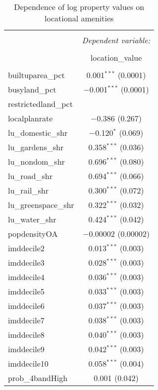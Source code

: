 \documentclass{article}\usepackage[]{graphicx}\usepackage[]{color}
\begin{document}
\begin{table}[!htbp] \centering 
  \caption{Dependence of log property values on locational amenities } 
  \label{} 
\small 
\begin{tabular}{@{\extracolsep{5pt}}lc} 
\\[-1.8ex]\hline 
\hline \\[-1.8ex] 
 & \multicolumn{1}{c}{\textit{Dependent variable:}} \\ 
\cline{2-2} 
\\[-1.8ex] & location\_value \\ 
\hline \\[-1.8ex] 
 builtuparea\_pct & 0.001$^{***}$ (0.0001) \\ 
  busyland\_pct & $-$0.001$^{***}$ (0.0001) \\ 
  restrictedland\_pct &  \\ 
  localplanrate & $-$0.386 (0.267) \\ 
  lu\_domestic\_shr & $-$0.120$^{*}$ (0.069) \\ 
  lu\_gardens\_shr & 0.358$^{***}$ (0.036) \\ 
  lu\_nondom\_shr & 0.696$^{***}$ (0.080) \\ 
  lu\_road\_shr & 0.694$^{***}$ (0.066) \\ 
  lu\_rail\_shr & 0.300$^{***}$ (0.072) \\ 
  lu\_greenspace\_shr & 0.322$^{***}$ (0.032) \\ 
  lu\_water\_shr & 0.424$^{***}$ (0.042) \\ 
  popdensityOA & $-$0.00002 (0.00002) \\ 
  imddecile2 & 0.013$^{***}$ (0.003) \\ 
  imddecile3 & 0.028$^{***}$ (0.003) \\ 
  imddecile4 & 0.036$^{***}$ (0.003) \\ 
  imddecile5 & 0.033$^{***}$ (0.003) \\ 
  imddecile6 & 0.037$^{***}$ (0.003) \\ 
  imddecile7 & 0.038$^{***}$ (0.003) \\ 
  imddecile8 & 0.040$^{***}$ (0.003) \\ 
  imddecile9 & 0.042$^{***}$ (0.003) \\ 
  imddecile10 & 0.058$^{***}$ (0.004) \\ 
  prob\_4bandHigh & 0.001 (0.042) \\ 

\end{tabular}
\end{table}
\end{document}
